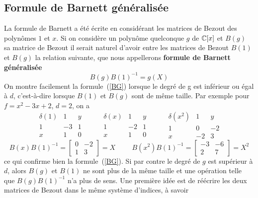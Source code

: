 \documentclass{standalone}
\begin{document}
\subsection{Formule de Barnett généralisée}
\label{Bar_gen}
La formule de Barnett a été écrite en considérant les matrices de Bezout des polynômes $1$ et $x$.
Si on considère un polynôme quelconque $g$ de $\mathbb{C}[x]$ et $B(g)$ sa matrice de Bezout il serait naturel d'avoir entre les matrices de Bezout $B(1)$ et $B(g)$ la relation suivante, que nous appellerons {\bf formule de Barnett généralisée}
\begin{equation}
	\label{BG}
	B(g)B(1)^{-1} = g(X)
\end{equation}
On montre facilement la formule~(\ref{BG}) lorsque le degré de g est inférieur ou égal à $d$, c'est-à-dire lorsque $B(1)$ et $B(g)$ sont de même taille. Par exemple pour $f = x^2 - 3x + 2$, $d = 2$, on a
$$
\begin{array}{c|cc}
	\delta(1) & 1 & y \\
	\hline
	1 & -3 & 1 \\
	x & 1 & 0
\end{array}
\hspace{1cm}
\begin{array}{c|cc}
	\delta(x) & 1 & y \\
	\hline
	1 & -2 & 1 \\
	x & 1 & 0
\end{array}
\hspace{1cm}
\begin{array}{c|cc}
	\delta(x^2) & 1 & y \\
	\hline
	1 & 0 & -2 \\
	x & -2 & 3
\end{array}
$$
\begin{equation}
	B(x)B(1)^{-1} =
	\begin{bmatrix}
		0 & -2 \\
		1 & 3
	\end{bmatrix}
	= X
	\hspace{1cm}
	B(x^2)B(1)^{-1} =
	\begin{bmatrix}
		-3 & -6 \\
		2 & 7
	\end{bmatrix}
	= X^2
\end{equation}
ce qui confirme bien la formule~(\ref{BG}).
Si par contre le degré de $g$ est supérieur à $d$, alors $B(g)$ et $B(1)$ ne sont plus de la même taille et une opération telle que $B(g)B(1)^{-1}$ n'a plus de sens. Une première idée est de réécrire les deux matrices de Bezout dans le même système d'indices, à savoir
\end{document}
